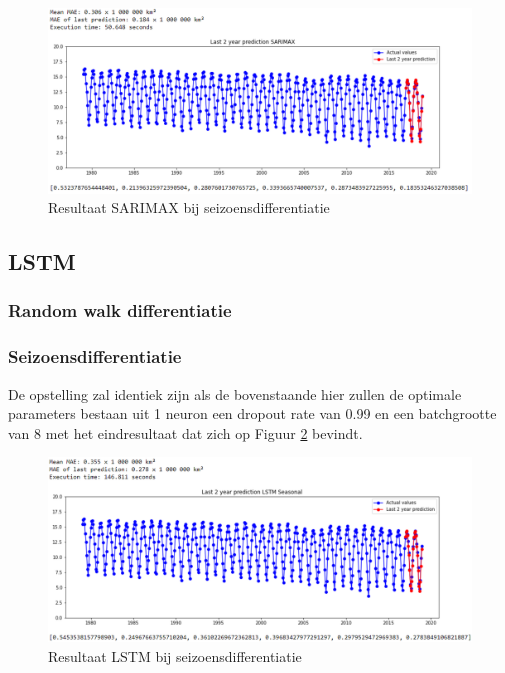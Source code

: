 \begin{figure}[!h]
    \centering
    \caption{Resultaat SARIMAX bij seizoensdifferentiatie}
    \label{fig:uvssarimaxsdiff}
    \includegraphics[width=1\linewidth]{uv_s_sarimax_s_diff}
\end{figure}

\subsection{LSTM}
\subsubsection{Random walk differentiatie}


\subsubsection{Seizoensdifferentiatie}

De opstelling zal identiek zijn als de bovenstaande hier zullen de optimale parameters bestaan uit 1 neuron een dropout rate van 0.99 en een batchgrootte van 8 met het eindresultaat dat zich op Figuur \ref{fig:uvslstmsdiff} bevindt.

\begin{figure}[!h]
    \centering
    \caption{Resultaat LSTM bij seizoensdifferentiatie}
    \label{fig:uvslstmsdiff}
    \includegraphics[width=1\linewidth]{uv_s_lstm_s_diff}
\end{figure}

